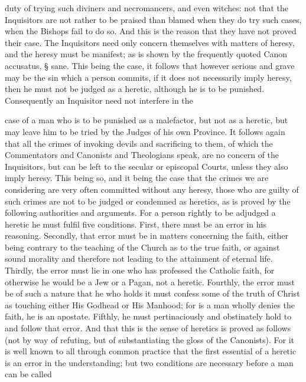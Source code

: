        duty of trying such diviners and necromancers, and even witches: not that the Inquisitors are
       not rather to be praised than blamed when they do try such cases, when the Bishops fail to
       do so. And this is the reason that they have not proved their case. The Inquisitors need only
       concern themselves with matters of heresy, and the heresy must be manifest; as is shown by
       the frequently quoted Canon accusatus, § sane.
             This being the case, it follows that however serious and grave may be the sin which a
       person commits, if it does not necessarily imply heresy, then he must not be judged as a
       heretic, although he is to be punished. Consequently an Inquisitor need not interfere in the

       case of a man who is to be punished as a malefactor, but not as a heretic, but may leave him
       to be tried by the Judges of his own Province.
             It follows again that all the crimes of invoking devils and sacrificing to them, of which
       the Commentators and Canonists and Theologians speak, are no concern of the Inquisitors,
       but can be left to the secular or episcopal Courts, unless they also imply heresy. This being
       so, and it being the case that the crimes we are considering are very often committed without
       any heresy, those who are guilty of such crimes are not to be judged or condemned as
       heretics, as is proved by the following authorities and arguments.
             For a person rightly to be adjudged a heretic he must fulfil five conditions. First, there
       must be an error in his reasoning. Secondly, that error must be in matters concerning the
       faith, either being contrary to the teaching of the Church as to the true faith, or against sound
       morality and therefore not leading to the attainment of eternal life. Thirdly, the error must lie
       in one who has professed the Catholic faith, for otherwise he would be a Jew or a Pagan, not
       a heretic. Fourthly, the error must be of such a nature that he who holds it must confess
       some of the truth of Christ as touching either His Godhead or His Manhood; for is a man
       wholly denies the faith, he is an apostate. Fifthly, he must pertinaciously and obstinately
       hold to and follow that error. And that this is the sense of heretics is proved as follows (not
       by way of refuting, but of substantiating the gloss of the Canonists).
             For it is well known to all through common practice that the first essential of a heretic
       is an error in the understanding; but two conditions are necessary before a man can be called
